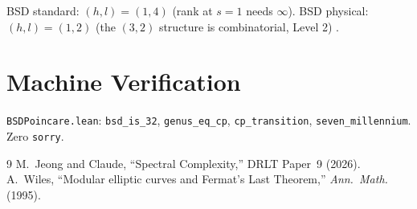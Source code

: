 \documentclass[12pt]{article}
\theoremstyle{remark}
\begin{document}
BSD standard: $(h, l) = (1, 4)$ (rank at $s = 1$ needs $\infty$).
BSD physical: $(h, l) = (1, 2)$ (the $(3,2)$ structure is
combinatorial, Level 2) \cite{Paper9}.

\section{Machine Verification}

\texttt{BSDPoincare.lean}: \texttt{bsd\_is\_32},
\texttt{genus\_eq\_cp}, \texttt{cp\_transition},
\texttt{seven\_millennium}. Zero \texttt{sorry}.

\begin{thebibliography}{9}
 M.~Jeong and Claude, ``Spectral Complexity,''
  DRLT Paper~9 (2026).
 A.~Wiles, ``Modular elliptic curves and
  Fermat's Last Theorem,'' \emph{Ann.\ Math.} (1995).
\end{thebibliography}
\end{document}
